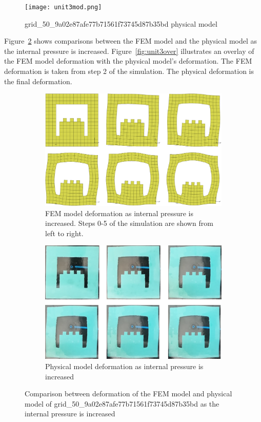 \begin{figure}[H]
	\centering
	\texttt{[image: unit3mod.png]}
	\caption[Physical validation model of unit 3]{grid\_50\_9a02e87afe77b71561f73745d87b35bd physical model}
	\label{fig:unit3mod}
\end{figure}

Figure~\ref{fig:unit3def} shows comparisons between the FEM model and the physical model as the internal pressure is increased. Figure~\ref{fig:unit3over} illustrates an overlay of the FEM model deformation with the physical model's deformation. The FEM deformation is taken from step 2 of the simulation. The physical deformation is the final deformation.

\begin{figure}[H]
	\centering
	\begin{subfigure}[c]{\textwidth}
		\centering
		\includegraphics[width=\textwidth]{unit3deffem.png}
		\caption{FEM model deformation as internal pressure is increased. Steps 0-5 of the simulation are shown from left to right.}
	\end{subfigure}
	\hfill
	\begin{subfigure}[c]{\textwidth}
		\centering
		\includegraphics[width=\textwidth]{unit3defmod.png}
		\caption{Physical model deformation as internal pressure is increased}
	\end{subfigure}
	\caption[Comparison between FEM and physical models of unit 3]{Comparison between deformation of the FEM model and physical model of grid\_50\_9a02e87afe77b71561f73745d87b35bd as the internal pressure is increased}
	\label{fig:unit3def}
\end{figure}

